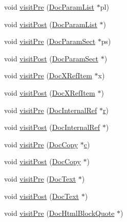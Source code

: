 \begin{DoxyCompactItemize}
\item 
void \hyperlink{class_print_doc_visitor_ab403fc1a7661f5a35b47ff14f3e83fad}{visit\+Pre} (\hyperlink{class_doc_param_list}{Doc\+Param\+List} $\ast$pl)
\item 
void \hyperlink{class_print_doc_visitor_af2afc1a7b0edfbcb7e54d3e0a422fe0a}{visit\+Post} (\hyperlink{class_doc_param_list}{Doc\+Param\+List} $\ast$)
\item 
void \hyperlink{class_print_doc_visitor_aaa6c9aebc24b376ad95e3d041a0dbe05}{visit\+Pre} (\hyperlink{class_doc_param_sect}{Doc\+Param\+Sect} $\ast$ps)
\item 
void \hyperlink{class_print_doc_visitor_a15dc17f35f9a3ff52465ad4ac511b975}{visit\+Post} (\hyperlink{class_doc_param_sect}{Doc\+Param\+Sect} $\ast$)
\item 
void \hyperlink{class_print_doc_visitor_a1c3a348d770a4c954c65000bc45c5d9b}{visit\+Pre} (\hyperlink{class_doc_x_ref_item}{Doc\+X\+Ref\+Item} $\ast$x)
\item 
void \hyperlink{class_print_doc_visitor_a43721b6b0ac85e0865984ba21dcaf631}{visit\+Post} (\hyperlink{class_doc_x_ref_item}{Doc\+X\+Ref\+Item} $\ast$)
\item 
void \hyperlink{class_print_doc_visitor_a52906b4fa60cfec262ad5b8da144d068}{visit\+Pre} (\hyperlink{class_doc_internal_ref}{Doc\+Internal\+Ref} $\ast$\hyperlink{060__command__switch_8tcl_a0a0bd3dc69dd06934c4e6362155e0ace}{r})
\item 
void \hyperlink{class_print_doc_visitor_aaecd3505a3aaa3c70f6c3dabff6b990c}{visit\+Post} (\hyperlink{class_doc_internal_ref}{Doc\+Internal\+Ref} $\ast$)
\item 
void \hyperlink{class_print_doc_visitor_ae3faa9a7e63dd8f015448b56459a95aa}{visit\+Pre} (\hyperlink{class_doc_copy}{Doc\+Copy} $\ast$\hyperlink{060__command__switch_8tcl_ab14f56bc3bd7680490ece4ad7815465f}{c})
\item 
void \hyperlink{class_print_doc_visitor_a9fbb832766bc65d15417315824e71613}{visit\+Post} (\hyperlink{class_doc_copy}{Doc\+Copy} $\ast$)
\item 
void \hyperlink{class_print_doc_visitor_ad761f1a772c4cd2ba8b31f25c9108a4d}{visit\+Pre} (\hyperlink{class_doc_text}{Doc\+Text} $\ast$)
\item 
void \hyperlink{class_print_doc_visitor_aeddf0f93604084255c945d73a1dd4e50}{visit\+Post} (\hyperlink{class_doc_text}{Doc\+Text} $\ast$)
\item 
void \hyperlink{class_print_doc_visitor_aa6a518555cb684bb8e15df5e3ae36ac0}{visit\+Pre} (\hyperlink{class_doc_html_block_quote}{Doc\+Html\+Block\+Quote} $\ast$)

\end{DoxyCompactItemize}
